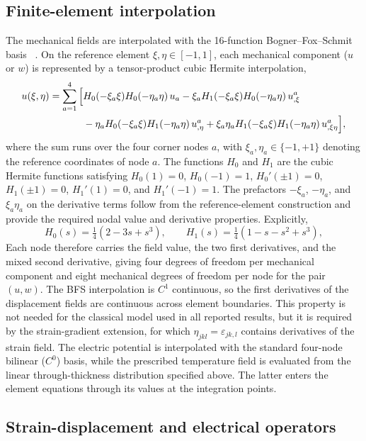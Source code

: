 \documentclass[a4paper,12pt]{elsarticle}
\begin{document}
\subsection{Finite-element interpolation}
\label{sec:discretization}

The mechanical fields are interpolated with the 16-function Bogner--Fox--Schmit
basis ~\cite{Bogner1965}. On the reference element
$\xi,\eta\in[-1,1]$, each mechanical component ($u$ or $w$) is represented by a
tensor-product cubic Hermite interpolation,
\begin{align}
u(\xi,\eta)=\sum_{a=1}^{4}\Big[&
H_0(-\xi_a\xi)H_0(-\eta_a\eta)\,u_a
-\xi_aH_1(-\xi_a\xi)H_0(-\eta_a\eta)\,u_{,\xi}^a\notag\\
&-\eta_aH_0(-\xi_a\xi)H_1(-\eta_a\eta)\,u_{,\eta}^a
+\xi_a\eta_aH_1(-\xi_a\xi)H_1(-\eta_a\eta)\,u_{,\xi\eta}^a\Big],
\label{eq:bfs-interp}
\end{align}
where the sum runs over the four corner nodes $a$, with
$\xi_a,\eta_a\in\{-1,+1\}$ denoting the reference coordinates of node $a$.
The functions $H_0$ and $H_1$ are the cubic Hermite functions satisfying
$H_0(1)=0$, $H_0(-1)=1$, $H_0'(\pm1)=0$,
$H_1(\pm1)=0$, $H_1'(1)=0$, and $H_1'(-1)=1$. The prefactors
$-\xi_a$, $-\eta_a$, and $\xi_a\eta_a$ on the derivative terms follow from the
reference-element construction and provide the required nodal value and derivative
properties. Explicitly,
\begin{equation}
H_0(s)=\tfrac14(2-3s+s^3),\qquad
H_1(s)=\tfrac14(1-s-s^2+s^3),
\label{eq:hermite}
\end{equation}
Each node therefore carries the field value, the two first derivatives, and the mixed
second derivative, giving four degrees of freedom per mechanical component and eight
mechanical degrees of freedom per node for the pair $(u,w)$. The BFS interpolation is
$C^1$ continuous, so the first derivatives of the displacement fields are continuous
across element boundaries. This property is not needed for the classical model used in all reported results, but it is required by the strain-gradient extension,
for which $\eta_{jkl}=\varepsilon_{jk,l}$ contains derivatives of the strain field.
The electric potential is interpolated with the standard four-node bilinear ($C^0$)
basis, while the prescribed temperature field is evaluated from the linear
through-thickness distribution specified above. The latter enters
the element equations through its values at the integration points.

\subsection{Strain-displacement and electrical operators}
\label{sec:Bops}
\end{document}
